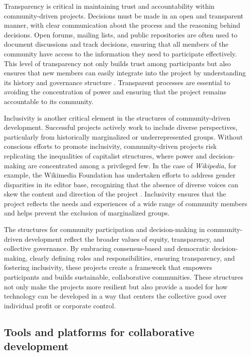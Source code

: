 \begin{refsection}
Transparency is critical in maintaining trust and accountability within community-driven projects. Decisions must be made in an open and transparent manner, with clear communication about the process and the reasoning behind decisions. Open forums, mailing lists, and public repositories are often used to document discussions and track decisions, ensuring that all members of the community have access to the information they need to participate effectively. This level of transparency not only builds trust among participants but also ensures that new members can easily integrate into the project by understanding its history and governance structure \cite[pp.~112-115]{mcalevey2021}. Transparent processes are essential to avoiding the concentration of power and ensuring that the project remains accountable to its community.

Inclusivity is another critical element in the structures of community-driven development. Successful projects actively work to include diverse perspectives, particularly from historically marginalized or underrepresented groups. Without conscious efforts to promote inclusivity, community-driven projects risk replicating the inequalities of capitalist structures, where power and decision-making are concentrated among a privileged few. In the case of \textit{Wikipedia}, for example, the Wikimedia Foundation has undertaken efforts to address gender disparities in its editor base, recognizing that the absence of diverse voices can skew the content and direction of the project \cite[pp.~45-47]{ford2013}. Inclusivity ensures that the project reflects the needs and experiences of a wide range of community members and helps prevent the exclusion of marginalized groups.

The structures for community participation and decision-making in community-driven development reflect the broader values of equity, transparency, and collective governance. By embracing consensus-based and democratic decision-making, clearly defining roles and responsibilities, ensuring transparency, and fostering inclusivity, these projects create a framework that empowers participants and builds sustainable, collaborative communities. These structures not only make the projects more resilient but also provide a model for how technology can be developed in a way that centers the collective good over individual profit or corporate control.

\subsection{Tools and platforms for collaborative development}


\end{refsection}
